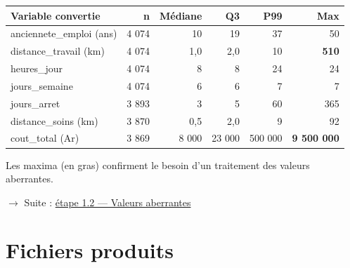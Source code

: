 \documentclass[

  french,

  10pt,

  a4paper,

]{article}
\newcounter{none} %
\begin{document}
{\def\LTcaptype{none} %

\begin{longtable}[]{@{}lrrrrr@{}}

\toprule\noalign{}

Variable convertie & n & Médiane & Q3 & P99 & Max \\

\midrule\noalign{}

\endhead

\bottomrule\noalign{}

\endlastfoot

anciennete\_emploi (ans) & 4 074 & 10 & 19 & 37 & 50 \\

distance\_travail (km) & 4 074 & 1,0 & 2,0 & 10 & \textbf{510} \\

heures\_jour & 4 074 & 8 & 8 & 24 & 24 \\

jours\_semaine & 4 074 & 6 & 6 & 7 & 7 \\

jours\_arret & 3 893 & 3 & 5 & 60 & 365 \\

distance\_soins (km) & 3 870 & 0,5 & 2,0 & 9 & 92 \\

cout\_total (Ar) & 3 869 & 8 000 & 23 000 & 500 000 & \textbf{9 500 000} \\

\end{longtable}

}



Les maxima (en gras) confirment le besoin d'un traitement des valeurs aberrantes.



\ensuremath{\rightarrow} Suite : \href{../1.2_aberrantes/README.pdf}{étape 1.2 --- Valeurs aberrantes}



\section{Fichiers produits}
\end{document}
